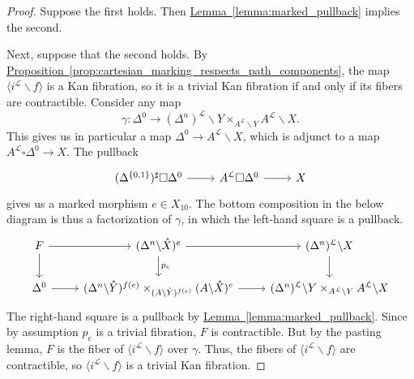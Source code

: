 \documentclass[main.tex]{subfiles}
\begin{document}
\begin{proof}
  Suppose the first holds. Then \hyperref[lemma:marked_pullback]{Lemma~\ref*{lemma:marked_pullback}} implies the second.

  Next, suppose that the second holds. By \hyperref[prop:cartesian_marking_respects_path_components]{Proposition~\ref*{prop:cartesian_marking_respects_path_components}}, the map $\langle i^{\mathcal{L}} \backslash f \rangle$ is a Kan fibration, so it is a trivial Kan fibration if and only if its fibers are contractible. Consider any map
  \begin{equation*}
    \gamma\colon \Delta^{0} \to (\Delta^{n})^{\mathcal{L}} \backslash Y \times_{A^{\mathcal{L}} \backslash Y} A^{\mathcal{L}} \backslash X.
  \end{equation*}
  This gives us in particular a map $\Delta^{0} \to A^{\mathcal{L}} \backslash X$, which is adjunct to a map $A^{\mathcal{L}} \square \Delta^{0} \to X$. The pullback
  \begin{equation*}
    \begin{tikzcd}
      (\Delta^{\{0, 1\}})^{\sharp} \square \Delta^{0}
      \arrow[r]
      & A^{\mathcal{L}} \square \Delta^{0}
      \arrow[r]
      & X
    \end{tikzcd}
  \end{equation*}
  gives us a marked morphism $e \in X_{10}$. The bottom composition in the below diagram is thus a factorization of $\gamma$, in which the left-hand square is a pullback.
  \begin{equation*}
    \begin{tikzcd}
      F
      \arrow[r]
      \arrow[d]
      & (\Delta^{n} \backslash \mathring{X})^{e}
      \arrow[r]
      \arrow[d, "p_{e}"]
      & (\Delta^{n})^{\mathcal{L}} \backslash X
      \arrow[d]
      \\
      \Delta^{0}
      \arrow[r]
      & (\Delta^{n} \backslash \mathring{Y})^{f(e)} \times_{(A \backslash \mathring{Y})^{f(e)}} (A \backslash \mathring{X})^{e}
      \arrow[r]
      & (\Delta^{n})^{\mathcal{L}} \backslash Y \times_{A^{\mathcal{L}} \backslash Y} A^{\mathcal{L}} \backslash X
    \end{tikzcd}
  \end{equation*}
  The right-hand square is a pullback by \hyperref[lemma:marked_pullback]{Lemma~\ref*{lemma:marked_pullback}}. Since by assumption $p_{e}$ is a trivial fibration, $F$ is contractible. But by the pasting lemma, $F$ is the fiber of $\langle i^{\mathcal{L}} \backslash f \rangle$ over $\gamma$. Thus, the fibers of $\langle i^{\mathcal{L}} \backslash f \rangle$ are contractible, so $\langle i^{\mathcal{L}} \backslash f \rangle$ is a trivial Kan fibration.
\end{proof}
\end{document}
